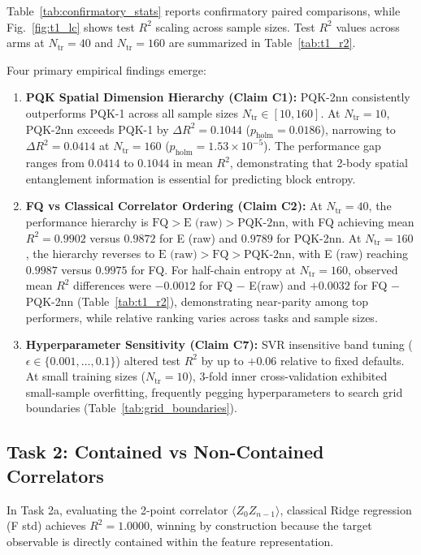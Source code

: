 \documentclass[conference]{IEEEtran}
\begin{document}
Table~\ref{tab:confirmatory_stats} reports confirmatory paired comparisons, while Fig.~\ref{fig:t1_lc} shows test $R^2$ scaling across sample sizes. Test $R^2$ values across arms at $N_{\text{tr}}=40$ and $N_{\text{tr}}=160$ are summarized in Table~\ref{tab:t1_r2}.



Four primary empirical findings emerge:
\begin{enumerate}
    \item \textbf{PQK Spatial Dimension Hierarchy (Claim C1):} PQK-2nn consistently outperforms PQK-1 across all sample sizes $N_{\text{tr}} \in [10, 160]$. At $N_{\text{tr}}=10$, PQK-2nn exceeds PQK-1 by $\Delta R^2 = 0.1044$ ($p_{\text{holm}} = 0.0186$), narrowing to $\Delta R^2 = 0.0414$ at $N_{\text{tr}}=160$ ($p_{\text{holm}} = 1.53 \times 10^{-5}$). The performance gap ranges from $0.0414$ to $0.1044$ in mean $R^2$, demonstrating that 2-body spatial entanglement information is essential for predicting block entropy.
    \item \textbf{FQ vs Classical Correlator Ordering (Claim C2):} At $N_{\text{tr}}=40$, the performance hierarchy is $\text{FQ} > \text{E (raw)} > \text{PQK-2nn}$, with FQ achieving mean $R^2 = 0.9902$ versus $0.9872$ for E (raw) and $0.9789$ for PQK-2nn. At $N_{\text{tr}}=160$, the hierarchy reverses to $\text{E (raw)} > \text{FQ} > \text{PQK-2nn}$, with E (raw) reaching $0.9987$ versus $0.9975$ for FQ. For half-chain entropy at $N_{\mathrm{tr}}=160$, observed mean $R^2$ differences were $-0.0012$ for FQ $-$ E(raw) and $+0.0032$ for FQ $-$ PQK-2nn (Table~\ref{tab:t1_r2}), demonstrating near-parity among top performers, while relative ranking varies across tasks and sample sizes.
    \item \textbf{Hyperparameter Sensitivity (Claim C7):} SVR insensitive band tuning ($\epsilon \in \{0.001, \dots, 0.1\}$) altered test $R^2$ by up to $+0.06$ relative to fixed defaults. At small training sizes ($N_{\text{tr}}=10$), 3-fold inner cross-validation exhibited small-sample overfitting, frequently pegging hyperparameters to search grid boundaries (Table~\ref{tab:grid_boundaries}).
\end{enumerate}

\subsection{Task 2: Contained vs Non-Contained Correlators}
In Task 2a, evaluating the 2-point correlator $\langle Z_0 Z_{n-1} \rangle$, classical Ridge regression (F std) achieves $R^2 = 1.0000$, winning by construction because the target observable is directly contained within the feature representation.
\end{document}
